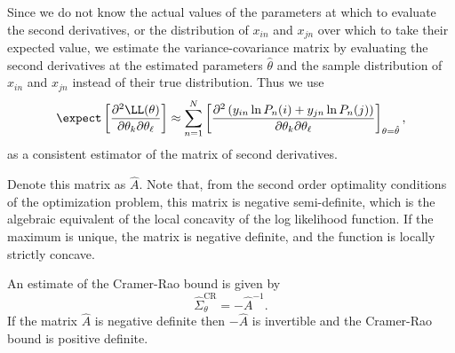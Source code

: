 \documentclass[12pt,a4paper]{article}
\begin{document}
Since we do not know the actual values of the parameters at which to
evaluate the second derivatives, or the distribution of $x_{in}$ and
$x_{jn}$ over which to take their expected value, we estimate the
variance-covariance matrix by evaluating the second derivatives  at the estimated parameters
$\hat{\theta}$ and the sample distribution of $x_{in}$ and $x_{jn}$ instead of
 their true distribution. Thus we use
\begin{equation}
  \label{eq:BAL4.35}
  \expect\left[\frac{\partial^2 \LL(\theta)}{\partial \theta_k \partial \theta_\ell}  \right]\approx \sum_{n=1}^N \left[\frac{\partial^2\left(y_{in}\ln P_n(i) + y_{jn} \ln P_n(j) \right)}{\partial \theta_k \partial \theta_\ell} \right]_{\theta=\hat{\theta}},
\end{equation}
as a consistent estimator of the matrix of second derivatives. 

Denote
this matrix as $\hat{A}$. Note that, from the second order optimality conditions of the optimization
problem, this matrix is negative semi-definite, which is the algebraic equivalent of the local  concavity of the
log likelihood function.
 If the maximum is unique, the matrix is negative definite, and the
 function is locally strictly concave. 




 An estimate of the Cramer-Rao
bound  is given by 
\begin{equation}
\label{eq:EstimateRaoCramer}
\widehat{\Sigma}^{\text{CR}}_{\theta} = -\hat{A}^{-1}.
\end{equation}
If  the matrix $\hat{A}$ is  negative definite then $-\hat{A}$ is invertible and the Cramer-Rao bound is positive definite. 
\end{document}
